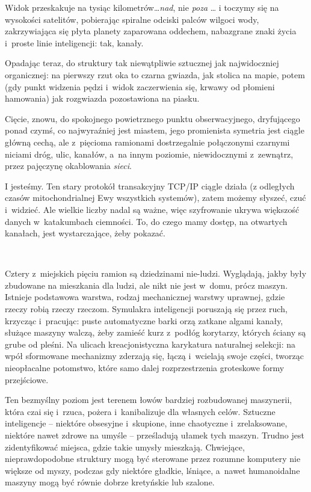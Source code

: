 \documentclass[oneside,polish,11pt,sfheadings]{mwbk}
\begin{document}
Widok przeskakuje na tysiąc kilometrów\ldots \emph{nad}, nie \emph{poza} \ldots
i toczymy się na wysokości satelitów, pobierając spiralne odciski palców
wilgoci wody, zakrzywiająca się płyta planety zaparowana oddechem,
nabazgrane znaki życia i~proste linie inteligencji: tak, kanały.

Opadając teraz, do struktury tak niewątpliwie sztucznej jak
najwidoczniej organicznej: na pierwszy rzut oka to czarna gwiazda, jak
stolica na mapie, potem (gdy punkt widzenia pędzi i~widok zaczerwienia
się, krwawy od płomieni hamowania) jak rozgwiazda pozostawiona na
piasku.

Cięcie, znowu, do spokojnego powietrznego punktu obserwacyjnego,
dryfującego ponad czymś, co najwyraźniej jest miastem, jego promienista
symetria jest ciągle główną cechą, ale z~pięcioma ramionami
dostrzegalnie połączonymi czarnymi niciami dróg, ulic, kanałów, a~na
innym poziomie, niewidocznymi z~zewnątrz, przez pajęczynę okablowania
\emph{sieci}.

I jesteśmy. Ten stary protokół transakcyjny TCP/IP ciągle działa (z
odległych czasów mitochondrialnej Ewy wszystkich systemów), zatem możemy
słyszeć, czuć i~widzieć. Ale wielkie liczby nadal są ważne, więc
szyfrowanie ukrywa większość danych w~katakumbach ciemności. To, do
czego mamy dostęp, na otwartych kanałach, jest wystarczające, żeby
pokazać.

~

Cztery z~miejskich pięciu ramion są dziedzinami nie-ludzi. Wyglądają,
jakby były zbudowane na mieszkania dla ludzi, ale nikt nie jest w~domu,
prócz maszyn. Istnieje podstawowa warstwa, rodzaj mechanicznej warstwy
uprawnej, gdzie rzeczy robią rzeczy rzeczom. Symulakra inteligencji
poruszają się przez ruch, krzycząc i~pracując: puste automatyczne barki
orzą zatkane algami kanały, służące maszyny walczą, żeby zamieść kurz z~podłóg korytarzy, których ściany są grube od pleśni. Na ulicach
kreacjonistyczna karykatura naturalnej selekcji: na wpół sformowane
mechanizmy zderzają się, łączą i~wcielają swoje części, tworząc
nieopłacalne potomstwo, które samo dalej rozprzestrzenia groteskowe
formy przejściowe.

Ten bezmyślny poziom jest terenem łowów bardziej rozbudowanej
maszynerii, która czai się i~rzuca, pożera i~kanibalizuje dla własnych
celów. Sztuczne inteligencje -- niektóre obsesyjne i~skupione, inne
chaotyczne i~zrelaksowane, niektóre nawet zdrowe na umyśle -- prześladują
ułamek tych maszyn. Trudno jest zidentyfikować miejsca, gdzie takie
umysły mieszkają. Chwiejące, nieprawdopodobne struktury mogą być
sterowane przez rozumne komputery nie większe od myszy, podczas gdy
niektóre gładkie, lśniące, a~nawet humanoidalne maszyny mogą być równie
dobrze kretyńskie lub szalone.
\end{document}
